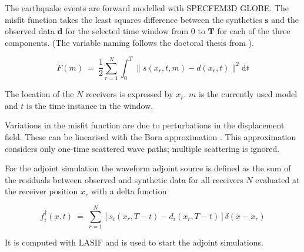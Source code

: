 The earthquake events are forward modelled with SPECFEM3D GLOBE. 
The misfit function takes the least squares difference between the synthetics $\boldsymbol{s}$ and the 
observed data $\boldsymbol{d}$ for the selected time window from $0$ to $\boldsymbol{T}$ for each of the three components. 
(The variable naming follows the doctoral thesis from \citealp{Magnoni2012}).

\begin{equation}
F(m) \ = \ \frac{1}{2} \sum_{r=1}^N \int_0^T \lVert  s(x_r, t, m) - d(x_r, t)  \lVert^2  \mathrm{d}t
\end{equation}

The location of the $N$ receivers is expressed by $x_r$. $m$ is the currently used model and $t$ is the time instance in the window.



Variations in the misfit function are due to perturbations in the displacement field. 
These can be linearised with the Born approximation \citep{Liu2012}.
This approximation %
considers only one-time scattered wave paths; multiple scattering is ignored.



For the adjoint simulation the waveform adjoint source is defined as the sum of the residuals between observed and 
synthetic data for all receivers $N$ evaluated at the receiver position $x_r$ with a delta function 

\begin{equation}
f_i^{\dagger}(x,t) \ = \ \sum_{r=1}^N [ s_i(x_r, T-t) - d_i(x_r, T-t) ] \delta (x-x_r)
\end{equation}

It is computed with LASIF and is used to start the adjoint simulations.



